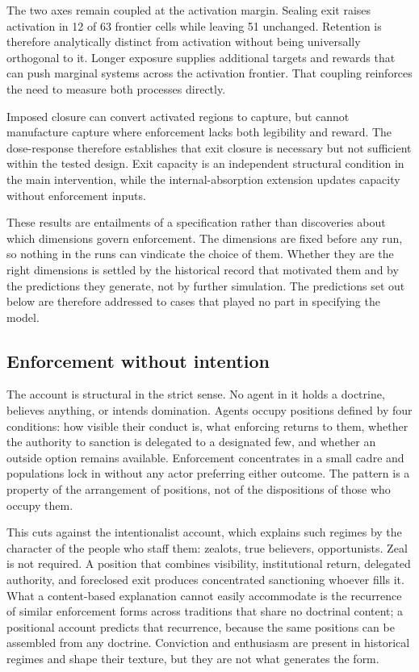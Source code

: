 \documentclass[12pt]{article}
\begin{document}
The two axes remain coupled at the activation margin. Sealing exit raises activation in 12 of 63 frontier cells while
leaving 51 unchanged. Retention is therefore analytically distinct from activation without being universally orthogonal
to it. Longer exposure supplies additional targets and rewards that can push marginal systems across the activation
frontier. That coupling reinforces the need to measure both processes directly.

Imposed closure can convert activated regions to capture, but cannot manufacture capture where enforcement lacks both
legibility and reward. The dose-response therefore establishes that exit closure is necessary but not sufficient within
the tested design. Exit capacity is an independent structural condition in the main intervention, while the
internal-absorption extension updates capacity without enforcement inputs.

These results are entailments of a specification rather than discoveries about which dimensions
govern enforcement. The dimensions are fixed before any run, so nothing in the runs can vindicate
the choice of them. Whether they are the right dimensions is settled by the historical record that
motivated them and by the predictions they generate, not by further simulation. The predictions set
out below are therefore addressed to cases that played no part in specifying the model.

\subsection{Enforcement without intention}

The account is structural in the strict sense. No agent in it holds a doctrine, believes anything,
or intends domination. Agents occupy positions defined by four conditions: how visible their conduct
is, what enforcing returns to them, whether the authority to sanction is delegated to a designated
few, and whether an outside option remains available. Enforcement concentrates in a small cadre and
populations lock in without any actor preferring either outcome. The pattern is a property of the
arrangement of positions, not of the dispositions of those who occupy them.

This cuts against the intentionalist account, which explains such regimes by the character of the
people who staff them: zealots, true believers, opportunists. Zeal is not required. A position that
combines visibility, institutional return, delegated authority, and foreclosed exit produces
concentrated sanctioning whoever fills it. What a content-based explanation cannot easily
accommodate is the recurrence of similar enforcement forms across traditions that share no doctrinal
content; a positional account predicts that recurrence, because the same positions can be assembled
from any doctrine. Conviction and enthusiasm are present in historical regimes and shape their
texture, but they are not what generates the form.
\end{document}
